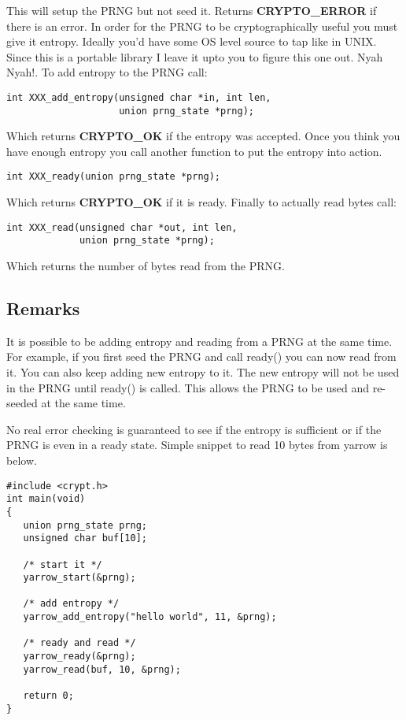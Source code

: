 \documentclass{book}
\begin{document}
This will setup the PRNG but not seed it.  Returns {\bf CRYPTO\_ERROR} if there is an error.  In order for the PRNG to be 
cryptographically useful you must give it entropy.  Ideally you'd have some OS level source to tap like in UNIX.  Since 
this is a portable library I leave it upto you to figure this one out.  Nyah Nyah!.  To add entropy to the PRNG call:
\begin{verbatim}
int XXX_add_entropy(unsigned char *in, int len, 
                    union prng_state *prng);
\end{verbatim}

Which returns {\bf CRYPTO\_OK} if the entropy was accepted.  Once you think you have enough entropy you call another
function to put the entropy into action.
\begin{verbatim}
int XXX_ready(union prng_state *prng);
\end{verbatim}

Which returns {\bf CRYPTO\_OK} if it is ready.  Finally to actually read bytes call:
\begin{verbatim}
int XXX_read(unsigned char *out, int len,
             union prng_state *prng);
\end{verbatim}

Which returns the number of bytes read from the PRNG.

\subsection{Remarks}

It is possible to be adding entropy and reading from a PRNG at the same time.  For example, if you first seed the PRNG
and call ready() you can now read from it.  You can also keep adding new entropy to it.  The new entropy will not be used
in the PRNG until ready() is called.  This allows the PRNG to be used and re-seeded at the same time.

No real error checking is guaranteed to see if the entropy is sufficient or if the PRNG is even in a ready state.  Simple
snippet to read 10 bytes from yarrow is below.

\begin{verbatim}
#include <crypt.h>
int main(void)
{
   union prng_state prng;
   unsigned char buf[10];

   /* start it */
   yarrow_start(&prng);

   /* add entropy */
   yarrow_add_entropy("hello world", 11, &prng);
 
   /* ready and read */
   yarrow_ready(&prng);
   yarrow_read(buf, 10, &prng);

   return 0;
}
\end{verbatim}
\end{document}
